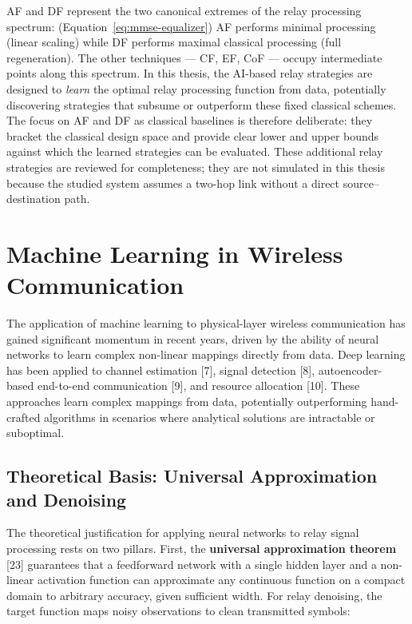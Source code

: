\documentclass[
  english,
  12pt,
  12pt,
  a4paper,
  oneside]{report}
\begin{document}
AF and DF represent the two canonical extremes of the relay processing spectrum: (Equation~\ref{eq:mmse-equalizer}) AF performs minimal processing (linear scaling) while DF performs maximal classical processing (full regeneration). The other techniques --- CF, EF, CoF --- occupy intermediate points along this spectrum. In this thesis, the AI-based relay strategies are designed to \emph{learn} the optimal relay processing function from data, potentially discovering strategies that subsume or outperform these fixed classical schemes. The focus on AF and DF as classical baselines is therefore deliberate: they bracket the classical design space and provide clear lower and upper bounds against which the learned strategies can be evaluated. These additional relay strategies are reviewed for completeness; they are not simulated in this thesis because the studied system assumes a two-hop link without a direct source--destination path.

\section{Machine Learning in Wireless Communication}\label{sec:machine-learning-in-wireless-communication}

The application of machine learning to physical-layer wireless communication has gained significant momentum in recent years, driven by the ability of neural networks to learn complex non-linear mappings directly from data. Deep learning has been applied to channel estimation {[}7{]}, signal detection {[}8{]}, autoencoder-based end-to-end communication {[}9{]}, and resource allocation {[}10{]}. These approaches learn complex mappings from data, potentially outperforming hand-crafted algorithms in scenarios where analytical solutions are intractable or suboptimal.

\subsection{Theoretical Basis: Universal Approximation and Denoising}\label{sec:theoretical-basis-universal-approximation-and-denoising}

The theoretical justification for applying neural networks to relay signal processing rests on two pillars. First, the \textbf{universal approximation theorem} {[}23{]} guarantees that a feedforward network with a single hidden layer and a non-linear activation function can approximate any continuous function on a compact domain to arbitrary accuracy, given sufficient width. For relay denoising, the target function maps noisy observations to clean transmitted symbols:
\end{document}
